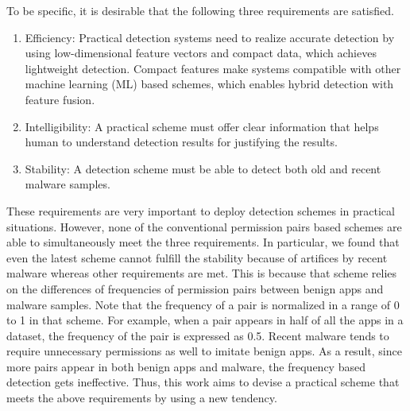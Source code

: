 \documentclass{ieeeaccess}
\begin{document}
To be specific, it is desirable that the following three requirements are satisfied.
\begin{enumerate}
  \item Efficiency: Practical detection systems need to realize accurate detection by using low-dimensional feature vectors and compact data, which achieves lightweight detection.  
    Compact features make systems compatible with other machine learning (ML) based schemes, which enables hybrid detection with feature fusion.
  \item Intelligibility: A practical scheme must offer clear information that helps human to understand detection results for justifying the results.
  \item Stability: A detection scheme must be able to detect both old and recent malware samples.
\end{enumerate}
These requirements are very important to deploy detection schemes in practical situations.
However, none of the conventional permission pairs based schemes are able to simultaneously meet the three requirements.
In particular, we found that even the latest scheme \cite{arora2019permpair} cannot fulfill the stability because of artifices by recent malware whereas other requirements are met. 
This is because that scheme relies on the differences of frequencies of permission pairs between benign apps and malware samples.
Note that the frequency of a pair is normalized in a range of 0 to 1 in that scheme.
For example, when a pair appears in half of all the apps in a dataset, the frequency of the pair is expressed as 0.5.
Recent malware tends to require unnecessary permissions as well to imitate benign apps.
As a result, since more pairs appear in both benign apps and malware, the frequency based detection gets ineffective.
Thus, this work aims to devise a practical scheme that meets the above requirements by using a new tendency.
\end{document}
